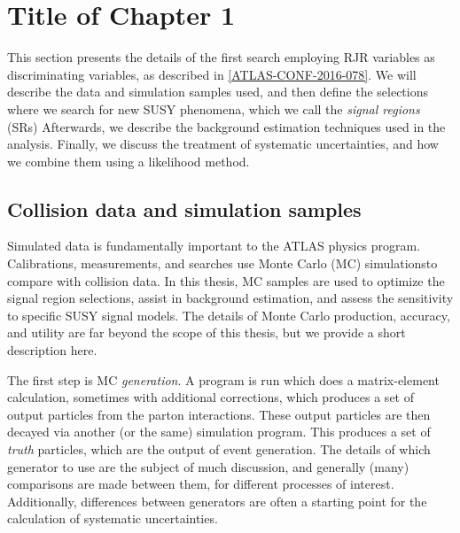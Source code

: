 

\chapter[A search for supersymmetric particles in zero lepton final states with the Recursive Jigsaw Technique][Top of Page Title]{Title of Chapter 1}

This section presents the details of the first search employing RJR variables as discriminating variables, as described in \ref{ATLAS-CONF-2016-078}.
We will describe the data and simulation samples used, and then define the selections where we search for new SUSY phenomena, which we call the \textit{signal regions} (SRs)
Afterwards, we describe the background estimation techniques used in the analysis.
Finally, we discuss the treatment of systematic uncertainties, and how we combine them using a likelihood method\cite{Baak:2014wma}.

\section{Collision data and simulation samples}

Simulated data is fundamentally important to the ATLAS physics program.
Calibrations, measurements, and searches use Monte Carlo (MC) simulations\footnotemark to compare with collision data.
In this thesis, MC samples are used to optimize the signal region selections, assist in background estimation, and assess the sensitivity to specific SUSY signal models.
The details of Monte Carlo production, accuracy, and utility are far beyond the scope of this thesis, but we provide a short description here.

The first step is MC \textit{generation}.
A program is run which does a matrix-element calculation, sometimes with additional corrections, which produces a set of output particles from the parton interactions.
These output particles are then decayed via another (or the same) simulation program.
This produces a set of \textit{truth} particles, which are the output of event generation.
The details of which generator to use are the subject of much discussion, and generally (many) comparisons are made between them, for different processes of interest.
Additionally, differences between generators are often a starting point for the calculation of systematic uncertainties.

